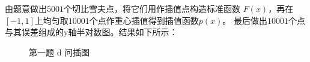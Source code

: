 \documentclass[12pt,a4paper,utf8]{ctexart}
\begin{document}
\begin{enumerate}
\begin{enumerate}
\begin{lstlisting}[frame=single]
    \end{lstlisting}
    \quad \quad 由题意做出$5001$个切比雪夫点，将它们用作插值点构造标准函数
    $F(x)$，再在$[-1,1]$上均匀取$10001$个点作重心插值得到插值函数$p(x)$。
    最后做出$10001$个点与其误差组成的y轴半对数图。结果如下所示：\\
    \begin{figure}[htbp]
        \centering
        \quad
        \quad
        
        \caption{第一题 d 问插图}
    \end{figure}
    \\
    \\
    \\
    \\
    \\
    \\
    \\
    \\
    \\
    \\
  \end{enumerate}
       



\end{enumerate}
\end{document}
